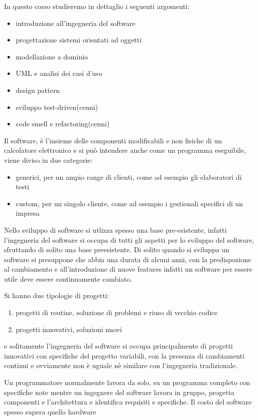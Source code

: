 \documentclass[a4paper,12pt, oneside]{book}
\begin{document}
In questo corso studieremo in dettaglio i seguenti argomenti:
\begin{itemize}
\item introduzione all'ingegneria del software
\item progettazione sistemi orientati ad oggetti
\item modellazione a dominio
\item UML e analisi dei casi d'uso
\item design pattern
\item sviluppo test-driven(cenni)
\item code smell e refactoring(cenni)
\end{itemize}
Il software, è l'insieme delle componenti modificabili e non fisiche di un calcolatore elettronico
e si può intendere anche come un programma eseguibile, viene diviso in due categorie:
\begin{itemize}
\item generici, per un ampio range di clienti, come ad esempio gli elaboratori di testi
\item custom, per un singolo cliente, come ad esempio i gestionali specifici di un impresa
\end{itemize}
Nello sviluppo di software si utlizza spesso una base pre-esistente, infatti l'ingegneria del software si occupa
di tutti gli aspetti per lo sviluppo del software, sfruttando di solito una base preesistente. \newline
Di solito quando si sviluppa un software si presuppone che abbia una durata di alcuni anni, con la predispozione
al cambiamento e all'introduzione di nuove features infatti un software per essere utile deve essere continuamente cambiato.

Si hanno due tipologie di progetti:
\begin{enumerate}
\item progetti di routine, soluzione di problemi e riuso di vecchio codice
\item progetti innovativi, soluzioni nuovi
\end{enumerate}
e solitamente l'ingegneria del software si occupa principalmente di progetti innovativi 
con specifiche del progetto variabili, con la presenza di cambiamenti continui e ovviamente 
non è uguale nè similare con l'ingegneria tradizionale.

Un programmatore normalmente lavora da solo, su un programma completo con specifiche note mentre un ingegnere del software
lavora in gruppo, progetta componenti e l'architettura e identifica requisiti e specifiche.
Il costo del software spesso supera quello hardware %
\end{document}
